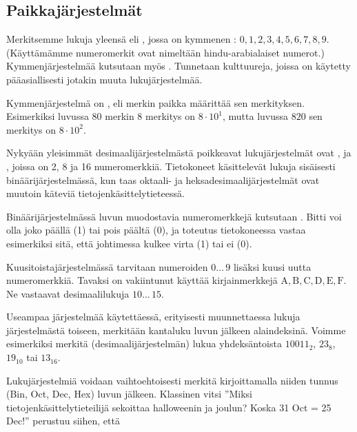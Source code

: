 \subsection*{Paikkajärjestelmät}

Merkitsemme lukuja yleensä  eli , jossa on kymmenen : $0, 1, 2, 3, 4, 5, 6, 7, 8, 9$. (Käyttämämme numeromerkit ovat nimeltään hindu-arabialaiset numerot.) Kymmenjärjestelmää kutsutaan myös . Tunnetaan kulttuureja, joissa on käytetty pääasiallisesti jotakin muuta lukujärjestelmää.

Kymmenjärjestelmä on , eli merkin paikka määrittää sen merkityksen.
Esimerkiksi luvussa $80$ merkin 8 merkitys on $8 \cdot 10^1$, mutta luvussa $820$ sen merkitys on $8 \cdot 10^2$.

Nykyään yleisimmät desimaalijärjestelmästä poikkeavat lukujärjestelmät ovat ,  ja , joissa on 2, 8 ja 16 numeromerkkiä. Tietokoneet käsittelevät lukuja sisäisesti binäärijärjestelmässä, kun taas oktaali- ja heksadesimaalijärjestelmät ovat muutoin käteviä tietojenkäsittelytieteessä.

Binäärijärjestelmässä luvun muodostavia numeromerkkejä kutsutaan . Bitti voi olla joko päällä (1) tai pois päältä (0), ja toteutus tietokoneessa vastaa esimerkiksi sitä, että johtimessa kulkee virta (1) tai ei (0).


Kuusitoistajärjestelmässä tarvitaan numeroiden $0 \ldots \, 9$ lisäksi kuusi uutta numeromerkkiä. Tavaksi on vakiintunut käyttää kirjainmerkkejä $\mathrm{A, B, C, D, E, F}$. Ne vastaavat desimaalilukuja $10 \ldots \, 15$.

Useampaa järjestelmää käytettäessä, erityisesti muunnettaessa lukuja järjestelmästä toiseen, merkitään kantaluku luvun jälkeen alaindeksinä. Voimme esimerkiksi merkitä (desimaalijärjestelmän) lukua yhdeksäntoista $10011_{2}$, $23_{8}$, $19_{10}$ tai $13_{16}$.

Lukujärjestelmiä voidaan vaihtoehtoisesti merkitä kirjoittamalla niiden tunnus (Bin, Oct, Dec, Hex) luvun jälkeen.
Klassinen vitsi ''Miksi tietojenkäsittelytieteilijä sekoittaa halloweenin ja joulun? Koska 31 Oct = 25 Dec!'' perustuu siihen, että

